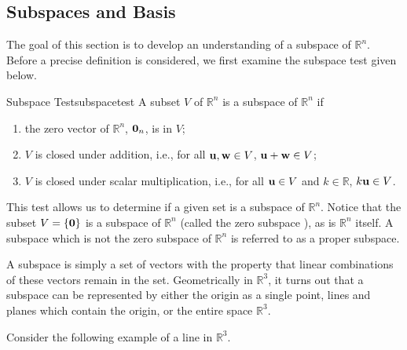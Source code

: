 \subsection{Subspaces and Basis}

The goal of this section is to develop an understanding of a subspace of $\mathbb{R}^n$. Before a precise definition is considered, we first examine the subspace test given below.

\begin{theorem}{Subspace Test}{subspacetest}
A subset $V$ of $\mathbb{R}^n$ is a subspace of $\mathbb{R}^n$ if 
\begin{enumerate}
\item the zero vector of $\mathbb{R}^n$, ${\bf 0}_n$, is in $V$;
\item $V$ is closed under addition, i.e., for all ${\bf u},{\bf w}\in V$, ${\bf u}+{\bf w}\in V$;
\item $V$ is closed under scalar multiplication, i.e., for all ${\bf u}\in V$
and $k\in\mathbb{R}$, $k{\bf u}\in V$.
\end{enumerate}
\end{theorem}

This test allows us to determine if a given set is a subspace of $\mathbb{R}^n$. Notice that the subset $V = \left\{ {\bf 0} \right\}$ is a subspace of $\mathbb{R}^n$ (called the zero subspace ), as is $\mathbb{R}^n$ itself. A subspace which is not the zero subspace of $\mathbb{R}^n$ is referred to as a proper subspace.

 A subspace is simply a set of vectors with the property that linear
combinations of these vectors remain in the set. Geometrically in
$\mathbb{R}^{3}$, it turns out that a subspace can be represented by
either the origin as a single point, lines and planes which contain
the origin, or the entire space $\mathbb{R}^{3}$. 

Consider the following example of a line in $\mathbb{R}^3$. 

